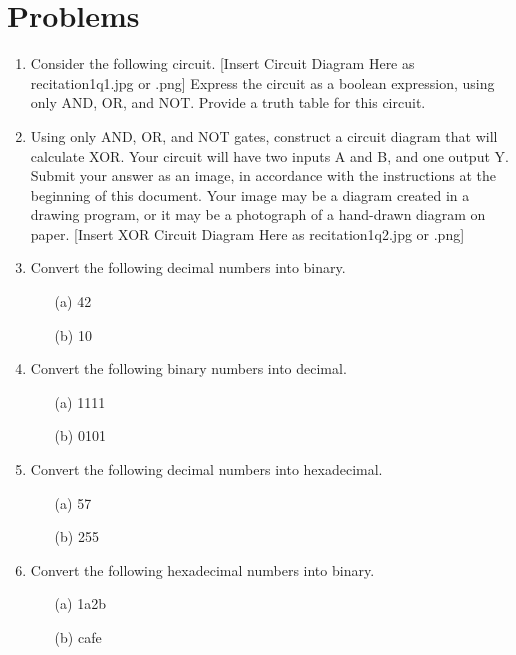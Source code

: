 \documentclass{article}
\begin{document}
\section*{Problems}
\begin{enumerate}
    \item Consider the following circuit.  [Insert Circuit Diagram Here as recitation1q1.jpg or .png]
    Express the circuit as a boolean expression, using only AND, OR, and NOT. Provide a truth table for this circuit.

    \item Using only AND, OR, and NOT gates, construct a circuit diagram that will calculate XOR. Your circuit will have two inputs A and B, and one output Y.
    Submit your answer as an image, in accordance with the instructions at the beginning of this document. Your image may be a diagram created in a drawing program, or it may be a photograph of a hand-drawn diagram on paper. [Insert XOR Circuit Diagram Here as recitation1q2.jpg or .png]

    \item Convert the following decimal numbers into binary.
    \begin{itemize}
        \item[(a)] 42
        \item[(b)] 10
    \end{itemize}

    \item Convert the following binary numbers into decimal.
    \begin{itemize}
        \item[(a)] 1111
        \item[(b)] 0101
    \end{itemize}

    \item Convert the following decimal numbers into hexadecimal.
    \begin{itemize}
        \item[(a)] 57
        \item[(b)] 255
    \end{itemize}

    \item Convert the following hexadecimal numbers into binary.
    \begin{itemize}
        \item[(a)] 1a2b
        \item[(b)] cafe
    \end{itemize}


\end{enumerate}
\end{document}
